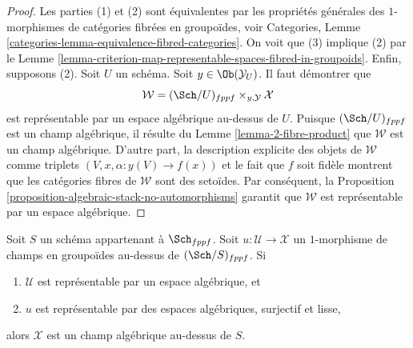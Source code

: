 \begin{proof}
Les parties (1) et (2) sont équivalentes par les propriétés générales des $1$-morphismes
de catégories fibrées en groupoïdes, voir
Categories, Lemme \ref{categories-lemma-equivalence-fibred-categories}.
On voit que (3) implique (2) par le
Lemme \ref{lemma-criterion-map-representable-spaces-fibred-in-groupoids}.
Enfin, supposons (2).
Soit $U$ un schéma. Soit $y \in \Ob(\mathcal{Y}_U)$.
Il faut démontrer que
$$
\mathcal{W} = (\Sch/U)_{fppf} \times_{y, \mathcal{Y}} \mathcal{X}
$$
est représentable par un espace algébrique au-dessus de $U$. Puisque
$(\Sch/U)_{fppf}$ est un champ algébrique, il résulte du
Lemme \ref{lemma-2-fibre-product}
que $\mathcal{W}$ est un champ algébrique.
D'autre part, la description explicite des objets de $\mathcal{W}$
comme triplets $(V, x, \alpha : y(V) \to f(x))$ et le fait que $f$ soit
fidèle montrent que les catégories fibres de $\mathcal{W}$ sont des setoïdes. Par conséquent, la
Proposition \ref{proposition-algebraic-stack-no-automorphisms}
garantit que $\mathcal{W}$ est représentable par un espace algébrique.
\end{proof}

\begin{lemma}
\label{lemma-smooth-surjective-morphism-implies-algebraic}
Soit $S$ un schéma appartenant à $\Sch_{fppf}$.
Soit $u : \mathcal{U} \to \mathcal{X}$ un $1$-morphisme de
champs en groupoïdes au-dessus de $(\Sch/S)_{fppf}$. Si
\begin{enumerate}
\item $\mathcal{U}$ est représentable par un espace algébrique, et
\item $u$ est représentable par des espaces algébriques, surjectif et lisse,
\end{enumerate}
alors $\mathcal X$ est un champ algébrique au-dessus de $S$.
\end{lemma}

